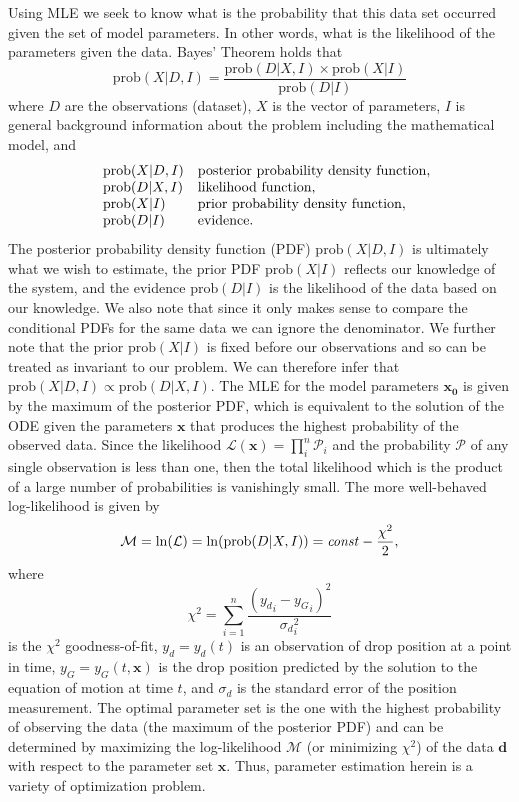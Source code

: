\documentclass[12pt,a4paper,oneside]{book}
\begin{document}
Using MLE we seek to know what is the probability that this data set occurred given the set of model parameters. In other words, what is the likelihood of the parameters given the data. Bayes' Theorem holds that
\[\mbox{prob}(X|D, I) = \frac{\mbox{prob}(D|X,I) \times \mbox{prob}(X|I)}{\mbox{prob}(D|I)}\]
where $D$ are the observations (dataset), $X$ is the vector of parameters, $I$ is general background information about the problem including the mathematical model, and 
\[\begin{array}{lll}
& \centering \mbox{prob}(X|D, I) & \mbox{posterior probability density function},\\
& \centering \mbox{prob}(D|X, I) & \mbox{likelihood function},\\
& \centering \mbox{prob}(X|I) &  \mbox{prior probability density function},\\
& \centering \mbox{prob}(D|I) &  \mbox{evidence}.
\end{array}
\]
The posterior probability density function (PDF) $\mbox{prob}(X|D, I)$ is ultimately what we wish to estimate, the prior PDF $\mbox{prob}(X|I)$ reflects our knowledge of the system, and the evidence $\mbox{prob}(D|I)$ is the likelihood of the data based on our knowledge. We also note that since it only makes sense to compare the conditional PDFs for the same data we can ignore the denominator. We further note that the prior $\mbox{prob}(X|I)$ is fixed before our observations and so can be treated as invariant to our problem. We can therefore infer that $\mbox{prob}(X|D, I) \propto \mbox{prob}(D|X, I)$. The MLE for the model parameters $\mathbf{x_0}$ is given by the maximum of the posterior PDF, which is equivalent to the solution of the ODE given the parameters $\mathbf{x}$ that produces the highest probability of the observed data. Since the likelihood $\mathcal{L}(\mathbf{x}) = \prod_i^n \mathcal{P}_i$ and the probability $\mathcal{P}$ of any single observation is less than one, then the total likelihood which is the product of a large number of probabilities is vanishingly small. The more well-behaved log-likelihood is given by
\[\mathcal{M} = \ln(\mathcal{L}) = \ln(\mbox{prob}(D|X, I)) = \mbox{\emph{const}} - \frac{\chi^2}{2},\]
where 
\[
\chi^2 = \sum^n_{i=1} \frac{\left({y_d}_i - {y_G}_i \right)^2}{{\sigma_d}_i^2}
\]
is the $\chi^2$ goodness-of-fit, $y_d = y_d(t)$ is an observation of drop position at a point in time, $y_G =  y_G(t, \mathbf{x})$ is the drop position predicted by the solution to the equation of motion at time $t$, and $\sigma_d$ is the standard error of the position measurement. The optimal parameter set is the one with the highest probability of observing the data (the maximum of the posterior PDF) and can be determined by maximizing the log-likelihood $\mathcal{M}$ (or minimizing $\chi^2$) of the data $\mathbf{d}$ with respect to the parameter set $\mathbf{x}$. Thus, parameter estimation herein is a variety of optimization problem. 
\end{document}
